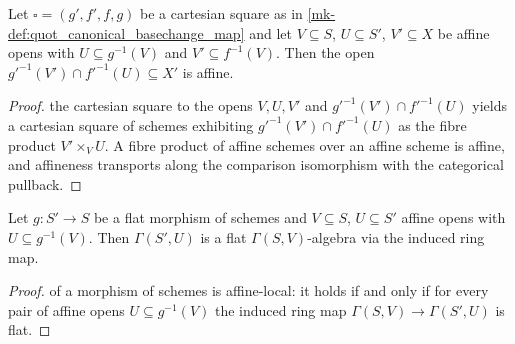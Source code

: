 \begin{lemma}
  \label{mk-lem:quot_isAffineOpen_preimage_inf}
  \leanok

  Let \(\square = (g', f', f, g)\) be a cartesian square as in
  \ref{mk-def:quot_canonical_basechange_map} and let \(V \subseteq S\),
  \(U \subseteq S'\), \(V' \subseteq X\) be affine opens with
  \(U \subseteq g^{-1}(V)\) and \(V' \subseteq f^{-1}(V)\). Then the open
  \(g'^{-1}(V') \cap f'^{-1}(U) \subseteq X'\) is affine.
\end{lemma}
\begin{proof}
  \leanokRestricting the cartesian square to the opens \(V, U, V'\) and
  \(g'^{-1}(V') \cap f'^{-1}(U)\) yields a cartesian square of schemes
  exhibiting \(g'^{-1}(V') \cap f'^{-1}(U)\) as the fibre product
  \(V' \times_V U\). A fibre product of affine schemes over an affine
  scheme is affine, and affineness transports along the comparison
  isomorphism with the categorical pullback.
\end{proof}

\begin{lemma}
  \label{mk-lem:quot_flat_gamma_appLE}
  \leanok

  Let \(g : S' \to S\) be a flat morphism of schemes and \(V \subseteq S\),
  \(U \subseteq S'\) affine opens with \(U \subseteq g^{-1}(V)\). Then
  \(\Gamma(S', U)\) is a flat \(\Gamma(S, V)\)-algebra via the induced ring
  map.
\end{lemma}
\begin{proof}
  \leanokFlatness of a morphism of schemes is affine-local: it holds if and only
  if for every pair of affine opens \(U \subseteq g^{-1}(V)\) the induced
  ring map \(\Gamma(S, V) \to \Gamma(S', U)\) is flat.
\end{proof}

